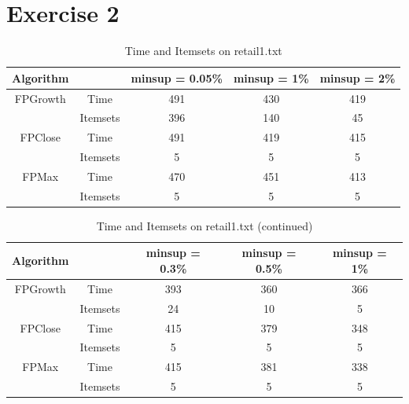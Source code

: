 \documentclass[12pt]{article}
\begin{document}
\section*{Exercise 2}
\begin{table}[h]
    \centering
    \begin{tabular}{ |c|c|c|c|c| }
        \hline
        \textbf{Algorithm} & & \textbf{minsup = 0.05\%} & \textbf{minsup = 1\%} & \textbf{minsup = 2\%} \\
        \hline
        \hline
        FPGrowth & Time & 491 & 430 & 419  \\
        & Itemsets & 396 & 140 & 45 \\
        \hline
        FPClose & Time & 491 & 419 & 415 \\
        & Itemsets & 5 & 5 & 5 \\
        \hline
        FPMax & Time & 470 & 451 & 413 \\
        & Itemsets & 5 & 5 & 5 \\
        \hline
        \end{tabular}
    \caption{Time and Itemsets on retail1.txt}
\end{table}

\begin{table}[h]
    \centering
    \begin{tabular}{ |c|c|c|c|c| }
        \hline
        \textbf{Algorithm} & & \textbf{minsup = 0.3\%} & \textbf{minsup = 0.5\%} & \textbf{minsup = 1\%} \\
        \hline
        \hline
        FPGrowth & Time & 393 & 360 & 366  \\
        & Itemsets & 24 & 10 & 5 \\
        \hline
        FPClose & Time & 415 & 379 & 348 \\
        & Itemsets & 5 & 5 & 5 \\
        \hline
        FPMax & Time & 415 & 381 & 338 \\
        & Itemsets & 5 & 5 & 5 \\
        \hline
        \end{tabular}
    \caption{Time and Itemsets on retail1.txt (continued)}
\end{table}
\end{document}

